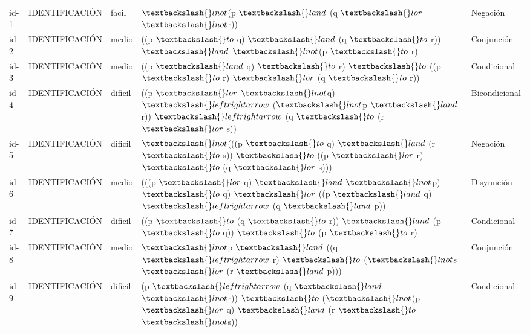 \documentclass[11pt,a4paper,openany]{book}
\begin{document}
\begin{center}
\begin{longtable}{lllll}
id-1 & IDENTIFICACIÓN & facil & $ \textbackslash\{\}lnot $(p $ \textbackslash\{\}land $ (q $ \textbackslash\{\}lor $ $ \textbackslash\{\}lnot $r)) & Negación \\
id-2 & IDENTIFICACIÓN & medio & ((p $ \textbackslash\{\}to $ q) $ \textbackslash\{\}land $ (q $ \textbackslash\{\}to $ r)) $ \textbackslash\{\}land $ $ \textbackslash\{\}lnot $(p $ \textbackslash\{\}to $ r) & Conjunción \\
id-3 & IDENTIFICACIÓN & medio & ((p $ \textbackslash\{\}land $ q) $ \textbackslash\{\}to $ r) $ \textbackslash\{\}to $ ((p $ \textbackslash\{\}to $ r) $ \textbackslash\{\}lor $ (q $ \textbackslash\{\}to $ r)) & Condicional \\
id-4 & IDENTIFICACIÓN & dificil & ((p $ \textbackslash\{\}lor $ $ \textbackslash\{\}lnot $q) $ \textbackslash\{\}leftrightarrow $ ($ \textbackslash\{\}lnot $p $ \textbackslash\{\}land $ r)) $ \textbackslash\{\}leftrightarrow $ (q $ \textbackslash\{\}to $ (r $ \textbackslash\{\}lor $ s)) & Bicondicional \\
id-5 & IDENTIFICACIÓN & dificil & $ \textbackslash\{\}lnot $(((p $ \textbackslash\{\}to $ q) $ \textbackslash\{\}land $ (r $ \textbackslash\{\}to $ s)) $ \textbackslash\{\}to $ ((p $ \textbackslash\{\}lor $ r) $ \textbackslash\{\}to $ (q $ \textbackslash\{\}lor $ s))) & Negación \\
id-6 & IDENTIFICACIÓN & medio & (((p $ \textbackslash\{\}lor $ q) $ \textbackslash\{\}land $ $ \textbackslash\{\}lnot $p) $ \textbackslash\{\}to $ q) $ \textbackslash\{\}lor $ ((p $ \textbackslash\{\}land $ q) $ \textbackslash\{\}leftrightarrow $ (q $ \textbackslash\{\}land $ p)) & Disyunción \\
id-7 & IDENTIFICACIÓN & dificil & ((p $ \textbackslash\{\}to $ (q $ \textbackslash\{\}to $ r)) $ \textbackslash\{\}land $ (p $ \textbackslash\{\}to $ q)) $ \textbackslash\{\}to $ (p $ \textbackslash\{\}to $ r) & Condicional \\
id-8 & IDENTIFICACIÓN & medio & $ \textbackslash\{\}lnot $p $ \textbackslash\{\}land $ ((q $ \textbackslash\{\}leftrightarrow $ r) $ \textbackslash\{\}to $ ($ \textbackslash\{\}lnot $s $ \textbackslash\{\}lor $ (r $ \textbackslash\{\}land $ p))) & Conjunción \\
id-9 & IDENTIFICACIÓN & dificil & (p $ \textbackslash\{\}leftrightarrow $ (q $ \textbackslash\{\}land $ $ \textbackslash\{\}lnot $r)) $ \textbackslash\{\}to $ ($ \textbackslash\{\}lnot $(p $ \textbackslash\{\}lor $ q) $ \textbackslash\{\}land $ (r $ \textbackslash\{\}to $ $ \textbackslash\{\}lnot $s)) & Condicional \\

\end{longtable}
\end{center}
\end{document}
